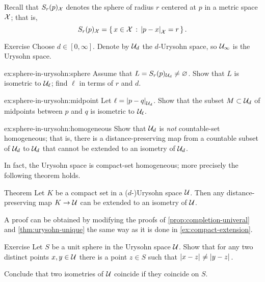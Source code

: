 Recall that $S_r(p)_{\mathcal{X}}$ denotes the sphere of radius $r$ centered at $p$ in a metric space $\mathcal{X}$;
that is, 
$$S_r(p)_{\spc{X}}=\set{x\in \spc{X}}{\dist{p}{x}{\spc{X}}=r}.$$

\begin{thm}{Exercise}\label{ex:sphere-in-urysohn}
Choose $d\in [0,\infty]$.
Denote by $\mathcal{U}_d$ the $d$-Urysohn space,
so $\mathcal{U}_\infty$ is the Urysohn space.

\begin{subthm}{ex:sphere-in-urysohn:sphere}
Assume that $L=S_r(p)_{\mathcal{U}_d}\ne \varnothing$.
Show that $L$ is isometric to $\mathcal{U}_{\ell}$; find $\ell$ in terms of $r$ and $d$.
\end{subthm}

\begin{subthm}{ex:sphere-in-urysohn:midpoint}
Let $\ell=\dist{p}{q}{\spc{U}_d}$.
Show that the subset $M\subset\mathcal{U}_d$ of midpoints between $p$ and $q$ is isometric to $\mathcal{U}_\ell$.
\end{subthm}

\begin{subthm}{ex:sphere-in-urysohn:homogeneous}
Show that $\mathcal{U}_d$ is \emph{not} countable-set homogeneous;
that is, there is a distance-preserving map from a countable subset of $\mathcal{U}_d$ to $\mathcal{U}_d$ that cannot be extended to an isometry of $\mathcal{U}_d$.
\end{subthm}

\end{thm}

In fact, the Urysohn space is compact-set homogeneous; more precisely the following theorem holds.

\begin{thm}{Theorem}\label{thm:compact-homogeneous}
Let $K$ be a compact set in a ($d$-)Urysohn space $\mathcal{U}$.
Then any distance-preserving map $K\to \mathcal{U}$ can be extended to an isometry of $\mathcal{U}$.
\end{thm}

A proof can be obtained by modifying the proofs of \ref{prop:completion-univeral} and \ref{thm:urysohn-unique}
the same way as it is done in \ref{ex:compact-extension}.

\begin{thm}{Exercise}\label{ex:shere}
Let $S$ be a unit sphere in the Urysohn space $\mathcal{U}$.
Show that for any two distinct points $x,y\in \mathcal{U}$ there is a point $z\in S$ such that 
$\dist{x}{z}{}\ne \dist{y}{z}{}$.

Conclude that two isometries of $\mathcal{U}$ coincide if they coincide on $S$.
\end{thm}

